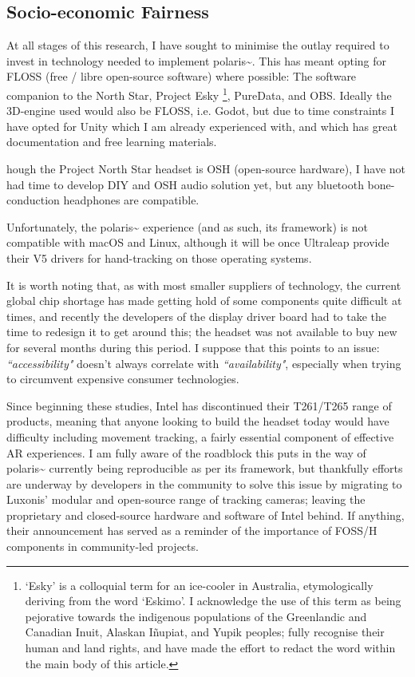 \subsection{Socio-economic Fairness}\label{sec: polaris-ethics-}
At all stages of this research, I have sought to minimise the outlay required to invest in technology needed to implement polaris\textasciitilde{}. This has meant opting for FLOSS (free / libre open-source software) where possible: The software companion to the North Star, Project Esky \footnote{`Esky' is a colloquial term for an ice-cooler in Australia, etymologically deriving from the word ‘Eskimo’. I acknowledge the use of this term as being pejorative towards the indigenous populations of the Greenlandic and Canadian Inuit, Alaskan Iñupiat, and Yupik peoples; fully recognise their human and land rights, and have made the effort to redact the word within the main body of this article.}, PureData, and OBS. Ideally the 3D-engine used would also be FLOSS, i.e. Godot, but due to time constraints I have opted for Unity which I am already experienced with, and which has great documentation and free learning materials.

hough the Project North Star headset is OSH (open-source hardware), I have not had time to develop DIY and OSH audio solution yet, but any bluetooth bone-conduction headphones are compatible.

Unfortunately, the polaris\textasciitilde{} experience (and as such, its framework) is not compatible with macOS and Linux, although it will be once Ultraleap provide their V5 drivers for hand-tracking on those operating systems.

It is worth noting that, as with most smaller suppliers of technology, the current global chip shortage has made getting hold of some components quite difficult at times, and recently the developers of the display driver board had to take the time to redesign it to get around this; the headset was not available to buy new for several months during this period. I suppose that this points to an issue: \textit{``accessibility"} doesn’t always correlate with \textit{``availability"}, especially when trying to circumvent expensive consumer technologies.

Since beginning these studies, Intel has discontinued their T261/T265 range of products, meaning that anyone looking to build the headset today would have difficulty including movement tracking, a fairly essential component of effective AR experiences. I am fully aware of the roadblock this puts in the way of polaris\textasciitilde{} currently being reproducible as per its framework, but thankfully efforts are underway by developers in the community to solve this issue by migrating to Luxonis’ modular and open-source range of tracking cameras; leaving the proprietary and closed-source hardware and software of Intel behind. If anything, their announcement has served as a reminder of the importance of FOSS/H components in community-led projects.

